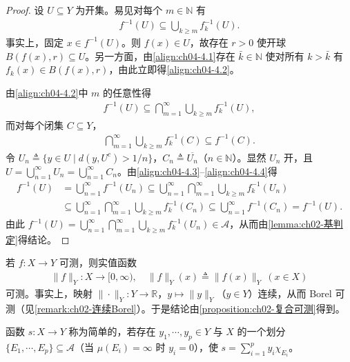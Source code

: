 \documentclass[../../main.tex]{subfiles}%
\begin{document}
\begin{proof}
设 $U\subseteq Y$ 为开集。易见对每个 $m\in\mathbb{N}$ 有
\begin{align}
f^{-1}(U)\subseteq\bigcup_{k\geqslant m}f_k^{-1}(U). \label{align:ch04-4.2}
\end{align}
事实上，固定 $x\in f^{-1}(U)$。则 $f(x)\in U$，故存在 $r>0$ 使开球 $B(f(x),r)\subseteq U$。另一方面，由\eqref{align:ch04-4.1}存在 $\bar k\in\mathbb{N}$ 使对所有 $k>\bar k$ 有 $f_k(x)\in B(f(x),r)$，由此立即得\eqref{align:ch04-4.2}。

由\eqref{align:ch04-4.2}中 $m$ 的任意性得
\begin{align}
f^{-1}(U)\subseteq\bigcap_{m=1}^{\infty}\bigcup_{k\geqslant m}f_k^{-1}(U), \label{align:ch04-4.3}
\end{align}
而对每个闭集 $C\subseteq Y$，
\begin{align}
\bigcap_{m=1}^{\infty}\bigcup_{k\geqslant m}f_k^{-1}(C)\subseteq f^{-1}(C). \label{align:ch04-4.4}
\end{align}
令 $U_n\triangleq \{y\in U\mid d(y,U^c)>1/n\}$，$C_n\triangleq \overline{U_n}$（$n\in\mathbb{N}$）。显然 $U_n$ 开，且 $U=\bigcup_{n=1}^\infty U_n=\bigcup_{n=1}^\infty C_n$。由\eqref{align:ch04-4.3}--\eqref{align:ch04-4.4}得
\begin{align*}
f^{-1}(U)&=\bigcup_{n=1}^\infty f^{-1}(U_n)\subseteq\bigcup_{n=1}^\infty\bigcap_{m=1}^\infty\bigcup_{k\geqslant m}f_k^{-1}(U_n)\\
&\subseteq\bigcup_{n=1}^\infty\bigcap_{m=1}^\infty\bigcup_{k\geqslant m}f_k^{-1}(C_n)\subseteq\bigcup_{n=1}^\infty f^{-1}(C_n)=f^{-1}(U).
\end{align*}
由此 $f^{-1}(U)=\bigcup_{n=1}^\infty\bigcap_{m=1}^\infty\bigcup_{k\geqslant m}f_k^{-1}(U_n)\in\mathcal{A}$，从而由\cref{lemma:ch02-基判定}得结论。
\end{proof}

\begin{remark}\label{remark:ch04-范数可测}
若 $f:X\to Y$ 可测，则实值函数
\begin{align}
\|f\|_Y:X\to[0,\infty),\quad \|f\|_Y(x)\triangleq \|f(x)\|_Y\ (x\in X) \label{align:ch04-4.5}
\end{align}
可测。事实上，映射 $\|\cdot\|_Y:Y\to\mathbb{R}$，$y\mapsto\|y\|_Y$（$y\in Y$）连续，从而 Borel 可测（见\cref{remark:ch02-连续Borel}）。于是结论由\cref{proposition:ch02-复合可测}得到。
\end{remark}

\begin{definition}[简单函数]\label{definition:ch04-简单函数}
函数 $s:X\to Y$ 称为简单的，若存在 $y_1,\cdots ,y_p\in Y$ 与 $X$ 的一个划分 $\{E_1,\cdots ,E_p\}\subseteq\mathcal{A}$（当 $\mu(E_i)=\infty$ 时 $y_i=0$），使 $s=\sum_{i=1}^p y_i\chi_{E_i}$。
\end{definition}
\end{document}
